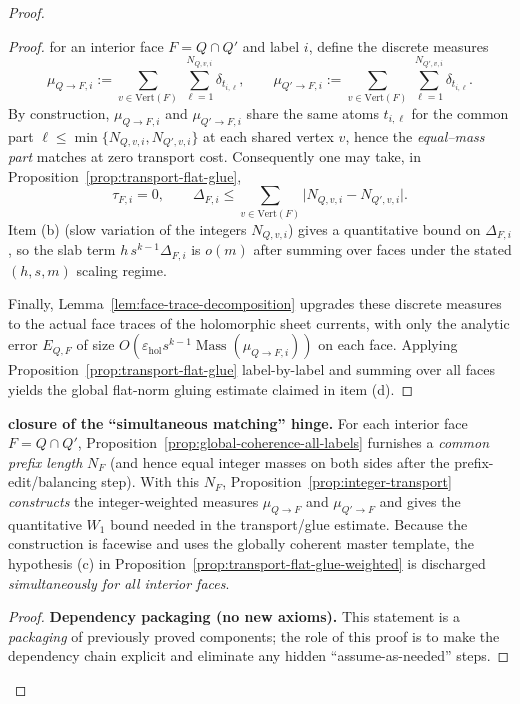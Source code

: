 \documentclass[11pt]{article}
\numberwithin{equation}{section}  %
\theoremstyle{plain}
\theoremstyle{definition}
\theoremstyle{remark}
\DeclareMathOperator{\Mass}{Mass}
\begin{document}
\begin{proof}
\begin{proof}
{\smallskip\noindent
for an interior face $F=Q\cap Q'$ and label $i$, define the discrete measures
\[
\mu_{Q\to F,i}:=\sum_{v\in \mathrm{Vert}(F)}\ \sum_{\ell=1}^{N_{Q,v,i}}\delta_{t_{i,\ell}},
\qquad
\mu_{Q'\to F,i}:=\sum_{v\in \mathrm{Vert}(F)}\ \sum_{\ell=1}^{N_{Q',v,i}}\delta_{t_{i,\ell}}.
\]
By construction, $\mu_{Q\to F,i}$ and $\mu_{Q'\to F,i}$ share the same atoms $t_{i,\ell}$ for the common part
$\ell\le \min\{N_{Q,v,i},N_{Q',v,i}\}$ at each shared vertex $v$, hence the \emph{equal--mass part} matches at zero
transport cost.  Consequently one may take, in Proposition~\ref{prop:transport-flat-glue},
\[
\tau_{F,i}=0,
\qquad
\Delta_{F,i}\le \sum_{v\in \mathrm{Vert}(F)}\bigl|N_{Q,v,i}-N_{Q',v,i}\bigr|.
\]
Item \textnormal{(b)} (slow variation of the integers $N_{Q,v,i}$) gives a quantitative bound on $\Delta_{F,i}$, so the
slab term $h\,s^{k-1}\Delta_{F,i}$ is $o(m)$ after summing over faces under the stated $(h,s,m)$ scaling regime.

\smallskip\noindent
Finally, Lemma~\ref{lem:face-trace-decomposition} upgrades these discrete measures to the actual face traces of the
holomorphic sheet currents, with only the analytic error $E_{Q,F}$ of size
$O(\varepsilon_{\mathrm{hol}} s^{k-1}\Mass(\mu_{Q\to F,i}))$ on each face.
Applying Proposition~\ref{prop:transport-flat-glue} label-by-label and summing over all faces yields the global flat-norm
gluing estimate claimed in item \textnormal{(d)}.
}

\end{proof}



\noindent\textbf{closure of the ``simultaneous matching'' hinge.}
For each interior face $F=Q\cap Q'$, Proposition~\ref{prop:global-coherence-all-labels} furnishes a \emph{common prefix length} $N_F$
(and hence equal integer masses on both sides after the prefix-edit/balancing step).
With this $N_F$, Proposition~\ref{prop:integer-transport} \emph{constructs} the integer-weighted measures
$\mu_{Q\to F}$ and $\mu_{Q'\to F}$ and gives the quantitative $W_1$ bound needed in the transport/glue estimate.
Because the construction is facewise and uses the globally coherent master template, the hypothesis (c) in
Proposition~\ref{prop:transport-flat-glue-weighted} is discharged \emph{simultaneously for all interior faces}.



\begin{proof}

\noindent\textbf{Dependency packaging (no new axioms).}
This statement is a \emph{packaging} of previously proved components; the role of this proof is to
make the dependency chain explicit and eliminate any hidden ``assume-as-needed'' steps.


\end{proof}
\end{proof}
\end{document}
